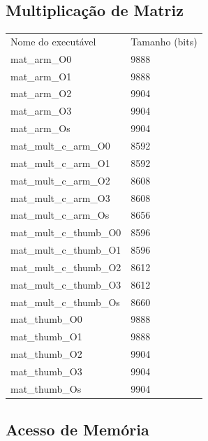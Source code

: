 \documentclass[a4paper,10pt]{article}
\begin{document}
\subsection*{Multiplicação de Matriz}
\begin{table}[H]
\begin{tabular}{ll}
\rowcolor[HTML]{CBCEFB} 
Nome do executável & Tamanho (bits) \\
mat\_arm\_O0 & 9888 \\
\rowcolor[HTML]{C0C0C0} 
mat\_arm\_O1 & 9888 \\
mat\_arm\_O2 & 9904 \\
\rowcolor[HTML]{C0C0C0} 
mat\_arm\_O3 & 9904 \\
mat\_arm\_Os & 9904 \\
\rowcolor[HTML]{C0C0C0} 
mat\_mult\_c\_arm\_O0 & 8592 \\
mat\_mult\_c\_arm\_O1 & 8592 \\
\rowcolor[HTML]{C0C0C0} 
mat\_mult\_c\_arm\_O2 & 8608 \\
mat\_mult\_c\_arm\_O3 & 8608 \\
\rowcolor[HTML]{C0C0C0} 
mat\_mult\_c\_arm\_Os & 8656 \\
mat\_mult\_c\_thumb\_O0 & 8596 \\
\rowcolor[HTML]{C0C0C0} 
mat\_mult\_c\_thumb\_O1 & 8596 \\
mat\_mult\_c\_thumb\_O2 & 8612 \\
\rowcolor[HTML]{C0C0C0} 
mat\_mult\_c\_thumb\_O3 & 8612 \\
mat\_mult\_c\_thumb\_Os & 8660 \\
\rowcolor[HTML]{C0C0C0} 
mat\_thumb\_O0 & 9888 \\
mat\_thumb\_O1 & 9888 \\
\rowcolor[HTML]{C0C0C0} 
mat\_thumb\_O2 & 9904 \\
mat\_thumb\_O3 & 9904 \\
\rowcolor[HTML]{C0C0C0} 
mat\_thumb\_Os & 9904
\end{tabular}


\end{table}

\subsection*{Acesso de Memória}
\end{document}
